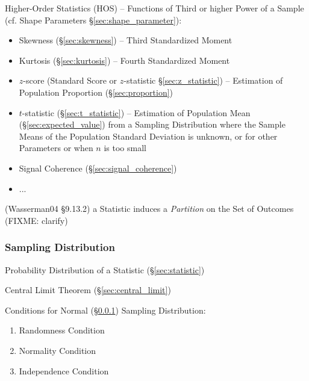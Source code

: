 Higher-Order Statistics (HOS) -- Functions of Third or higher Power of a Sample
(cf. Shape Parameters \S\ref{sec:shape_parameter}):
\begin{itemize}
  \item Skewness (\S\ref{sec:skewness}) -- Third Standardized Moment
  \item Kurtosis (\S\ref{sec:kurtosis}) -- Fourth Standardized Moment
\end{itemize}

\asterism

\begin{itemize}
  \item $z$-score (Standard Score or $z$-statistic \S\ref{sec:z_statistic})
    -- Estimation of Population Proportion (\S\ref{sec:proportion})
  \item $t$-statistic (\S\ref{sec:t_statistic}) -- Estimation of Population Mean
    (\S\ref{sec:expected_value}) from a Sampling Distribution where the Sample
    Means of the Population Standard Deviation is unknown, or for other
    Parameters or when $n$ is too small
\end{itemize}

\asterism

\begin{itemize}
  \item Signal Coherence (\S\ref{sec:signal_coherence})
  \item ...
\end{itemize}

\asterism

(Wasserman04 \S9.13.2) a Statistic induces a \emph{Partition} on the Set of
Outcomes (FIXME: clarify)



\subsubsection{Sampling Distribution}\label{sec:sampling_distribution}

Probability Distribution of a Statistic (\S\ref{sec:statistic})

\fist Central Limit Theorem (\S\ref{sec:central_limit})

Conditions for Normal (\S\ref{sec:sampling_distribution}) Sampling Distribution:
\begin{enumerate}
  \item Randomness Condition
  \item Normality Condition
  \item Independence Condition
\end{enumerate}


